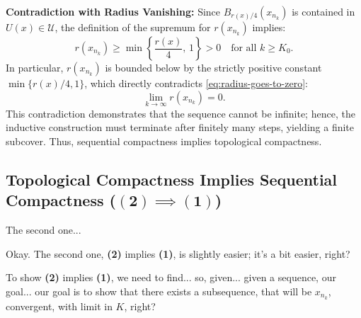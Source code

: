 \begin{proofWrapper}
\begin{content}
\begin{center}
\end{center}

\textbf{Contradiction with Radius Vanishing:}
Since $B_{r(x)/4}(x_{n_k})$ is contained in $U(x) \in \mathcal{U}$, the definition of the supremum for $r(x_{n_k})$ implies:
\[
r(x_{n_k}) \ge \min \left\{ \frac{r(x)}{4}, \, 1 \right\} > 0 \quad \text{for all } k \ge K_0.
\]
In particular, $r(x_{n_k})$ is bounded below by the strictly positive constant $\min\{r(x)/4, 1\}$, which directly contradicts \cref{eq:radius-goes-to-zero}:
\[
\lim_{k \to \infty} r(x_{n_k}) = 0.
\]
This contradiction demonstrates that the sequence cannot be infinite; hence, the inductive construction must terminate after finitely many steps, yielding a finite subcover. Thus, sequential compactness implies topological compactness.
\end{content}

\subsection{Topological Compactness Implies Sequential Compactness (\texorpdfstring{$\mathbf{(2)} \implies \mathbf{(1)}$}{(2) => (1)})}

\begin{speech}[00:10:05 - 00:12:05]
The second one... 

Okay. The second one, \textbf{(2)} implies \textbf{(1)}, is slightly easier; it's a bit easier, right?

To show \textbf{(2)} implies \textbf{(1)}, we need to find... so, given...  given a sequence, our goal...  our goal is to show that there exists a subsequence, that will be $x_{n_k}$, convergent, with limit in $K$, right?


\end{speech}
\end{proofWrapper}
